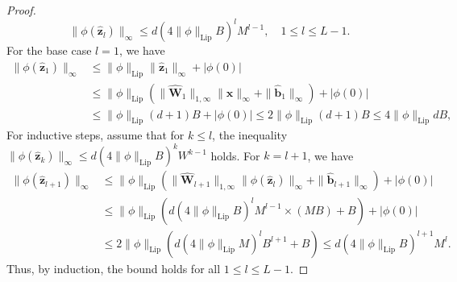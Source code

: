 \documentclass[10pt,a4paper]{amsart}
\newcommand{\bW}{\fbf{W}}
\newcommand{\bb}{\fbf{b}}
\newcommand{\bx}{\fbf{x}}
\newcommand{\bz}{\fbf{z}}
\newcommand{\fbf}[1]{\boldsymbol{#1}}
\renewcommand{\le}{\leqslant}
\renewcommand{\leq}{\le}
\begin{document}
\begin{proof}
    \begin{equation*}
        \| \phi (\widehat{\bz}_l)\|_{\infty} \leq d(4 \|\phi\|_{\mathrm{Lip}}B)^{l} M^{l-1}, \quad 1 \leq l \leq L-1.
    \end{equation*}
    For the base case $l=1$, we have 
    \begin{equation*}
        \begin{aligned}
            \|\phi(\widehat{\bz}_1)\|_{\infty}  & \leq \|\phi\|_{\mathrm{Lip}} \|\widehat{\bz}_1\|_{\infty} + |\phi(0)| \\
            & \leq \|\phi\|_{\mathrm{Lip}} \left( \| \widehat{\bW}_1\|_{1, \infty} \|\bx\|_{\infty} + \|\widehat{\bb}_1\|_{\infty}\right) + |\phi(0)|  \\
            & \leq \|\phi\|_{\mathrm{Lip}}(d+1) B + |\phi(0)|  \leq 2 \|\phi\|_{\mathrm{Lip}}(d+1)B \leq 4 \|\phi\|_{\mathrm{Lip}} d B,
        \end{aligned}
    \end{equation*}
    For inductive steps, assume that for $k \leq l$, the inequality $\| \phi (\widehat{\bz}_k)\|_{\infty} \leq d(4 \|\phi\|_{\mathrm{Lip}}B)^{k} W^{k-1}$ holds. For $k = l+1$, we have 
    \begin{equation*}
        \begin{aligned}
            \| \phi (\widehat{\bz}_{l+1})\|_{\infty} & \leq \|\phi\|_{\mathrm{Lip}} \left( \| \widehat{\bW}_{l+1}\|_{1, \infty} \| \phi (\widehat{\bz}_l)\|_{\infty} + \|\widehat{\bb}_{l+1}\|_{\infty}\right) + |\phi(0)|  \\
            & \leq \|\phi\|_{\mathrm{Lip}} \left( d(4 \|\phi\|_{\mathrm{Lip}} B)^{l} M^{l-1} \times (MB) + B \right)  + |\phi(0)| \\
            & \leq 2 \|\phi\|_{\mathrm{Lip}} \left( d(4 \|\phi\|_{\mathrm{Lip}} M)^{l} B^{l+1} + B \right) \leq d (4 \|\phi\|_{\mathrm{Lip}} B)^{l+1} M^{l}.
        \end{aligned}
    \end{equation*}
    Thus, by induction, the bound holds for all $1 \leq l \leq L-1$. 
    


\end{proof}
\end{document}
